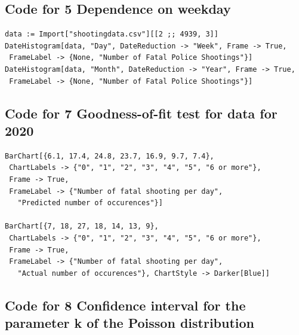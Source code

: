 \documentclass[a4paper]{article}
\begin{document}
	\subsection{Code for 5 Dependence on weekday}
\begin{lstlisting}
data := Import["shootingdata.csv"][[2 ;; 4939, 3]]
DateHistogram[data, "Day", DateReduction -> "Week", Frame -> True, 
 FrameLabel -> {None, "Number of Fatal Police Shootings"}]
DateHistogram[data, "Month", DateReduction -> "Year", Frame -> True, 
 FrameLabel -> {None, "Number of Fatal Police Shootings"}]
\end{lstlisting}

	\subsection{Code for 7 Goodness-of-fit test for data for 2020}
\begin{lstlisting}
BarChart[{6.1, 17.4, 24.8, 23.7, 16.9, 9.7, 7.4}, 
 ChartLabels -> {"0", "1", "2", "3", "4", "5", "6 or more"}, 
 Frame -> True, 
 FrameLabel -> {"Number of fatal shooting per day", 
   "Predicted number of occurences"}]

BarChart[{7, 18, 27, 18, 14, 13, 9}, 
 ChartLabels -> {"0", "1", "2", "3", "4", "5", "6 or more"}, 
 Frame -> True, 
 FrameLabel -> {"Number of fatal shooting per day", 
   "Actual number of occurences"}, ChartStyle -> Darker[Blue]]
\end{lstlisting}

	\subsection{Code for 8 Confidence interval for the parameter k of the Poisson distribution}
\end{document}

